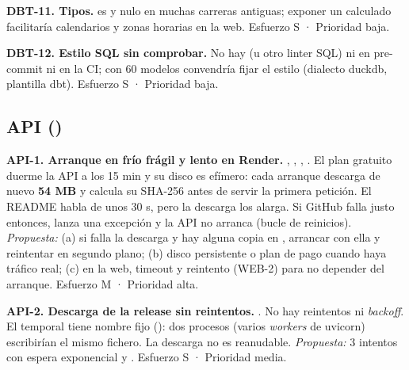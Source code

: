 \textbf{DBT-11. Tipos.}  es  y nulo en muchas carreras antiguas; exponer un  calculado facilitaría calendarios y zonas horarias en la web. Esfuerzo S · Prioridad baja.

\textbf{DBT-12. Estilo SQL sin comprobar.} No hay  (u otro linter SQL) ni en pre-commit ni en la CI; con 60 modelos convendría fijar el estilo (dialecto duckdb, plantilla dbt). Esfuerzo S · Prioridad baja.

\subsection{API ()}

\textbf{API-1. Arranque en frío frágil y lento en Render.} , , , . El plan gratuito duerme la API a los 15 min y su disco es efímero: cada arranque descarga de nuevo \textbf{54 MB} y calcula su SHA-256 antes de servir la primera petición. El README habla de unos 30 s, pero la descarga los alarga. Si GitHub falla justo entonces,  lanza una excepción y la API no arranca (bucle de reinicios). \emph{Propuesta:} (a) si falla la descarga y hay alguna copia en , arrancar con ella y reintentar en segundo plano; (b) disco persistente o plan de pago cuando haya tráfico real; (c) en la web, timeout y reintento (WEB-2) para no depender del arranque. Esfuerzo M · Prioridad alta.

\textbf{API-2. Descarga de la release sin reintentos.} . No hay reintentos ni \emph{backoff}. El temporal tiene nombre fijo (): dos procesos (varios \emph{workers} de uvicorn) escribirían el mismo fichero. La descarga no es reanudable. \emph{Propuesta:} 3 intentos con espera exponencial y . Esfuerzo S · Prioridad media.

